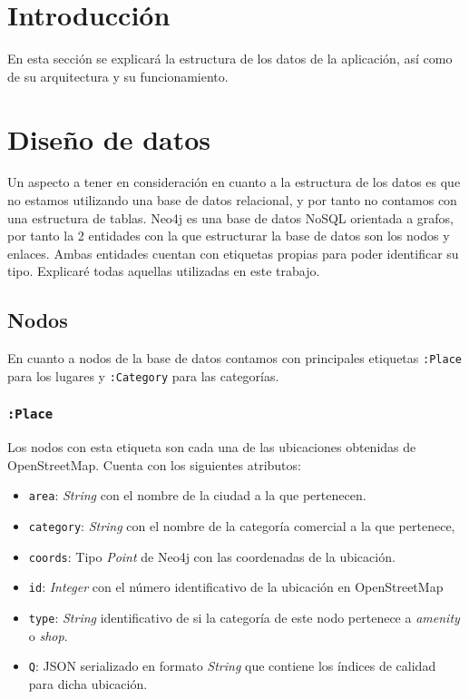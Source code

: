
\section{Introducción}

En esta sección se explicará la estructura de los datos de la aplicación, así como de su arquitectura y su funcionamiento.

\section{Diseño de datos}
Un aspecto a tener en consideración en cuanto a la estructura de los datos es que no estamos utilizando una base de datos relacional, y por tanto no contamos con una estructura de tablas. Neo4j es una base de datos NoSQL orientada a grafos, por tanto la 2 entidades con la que estructurar la base de datos son los nodos y enlaces. Ambas entidades cuentan con etiquetas propias para poder identificar su tipo. Explicaré todas aquellas utilizadas en este trabajo.

\subsection{Nodos}

En cuanto a nodos de la base de datos contamos con principales etiquetas \texttt{:Place} para los lugares y \texttt{:Category} para las categorías.

\subsubsection{\texttt{:Place}}

Los nodos con esta etiqueta son cada una de las ubicaciones obtenidas de OpenStreetMap. Cuenta con los siguientes atributos:

\begin{itemize}
	\item \texttt{area}: \textit{String} con el nombre de la ciudad a la que pertenecen.
	\item \texttt{category}: \textit{String} con el nombre de la categoría comercial a la que pertenece,
	\item \texttt{coords}: Tipo \textit{Point} de Neo4j con las coordenadas de la ubicación.
	\item \texttt{id}: \textit{Integer} con el número identificativo de la ubicación en OpenStreetMap
	\item \texttt{type}: \textit{String} identificativo de si la categoría de este nodo pertenece a \textit{amenity} o \textit{shop}.
	\item \texttt{Q}: JSON serializado en formato \textit{String} que contiene los índices de calidad para dicha ubicación.
\end{itemize}

